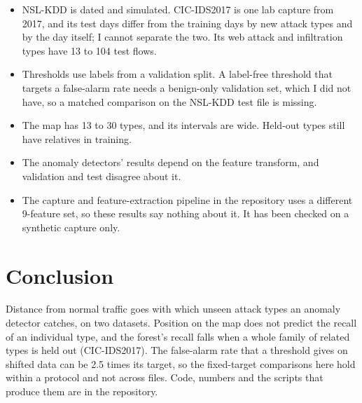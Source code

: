 \documentclass[10pt]{article}
\begin{document}
\begin{itemize}
\item NSL-KDD is dated and simulated. CIC-IDS2017 is one lab capture from 2017, and its test days differ from the
training days by new attack types and by the day itself; I cannot separate the two. Its web attack and
infiltration types have 13 to 104 test flows.
\item Thresholds use labels from a validation split. A label-free threshold that targets a false-alarm rate needs a
benign-only validation set, which I did not have, so a matched comparison on the NSL-KDD test file is missing.
\item The map has 13 to 30 types, and its intervals are wide. Held-out types still have relatives in training.
\item The anomaly detectors' results depend on the feature transform, and validation and test disagree about it.
\item The capture and feature-extraction pipeline in the repository uses a different 9-feature set, so these
results say nothing about it. It has been checked on a synthetic capture only.
\end{itemize}

\section{Conclusion}

Distance from normal traffic goes with which unseen attack types an anomaly detector catches, on two datasets.
Position on the map does not predict the recall of an individual type, and the forest's recall falls when a whole family of related types is held out (CIC-IDS2017). The false-alarm rate that a threshold gives on shifted data can be 2.5 times its target, so the
fixed-target comparisons here hold within a protocol and not across files. Code, numbers and the scripts that
produce them are in the repository.
\end{document}
